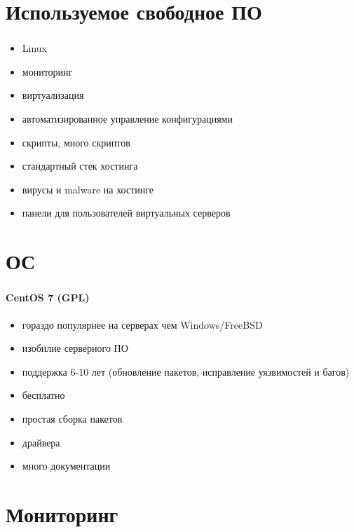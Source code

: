
\section{Используемое свободное ПО}

\begin{frame}
\frametitle{\insertsection}
\begin{itemize}
	\item Linux
	\item мониторинг
	\item виртуализация
	\item автоматизированное управление конфигурациями
	\item скрипты, много скриптов
	\item стандартный стек хостинга
	\item вирусы и malware на хостинге
	\item панели для пользователей виртуальных серверов
\end{itemize}
\end{frame}


\section{ОС}

\begin{frame}
\frametitle{\insertsection}
\framesubtitle{CentOS 7 (GPL)}
\begin{itemize}
	\item гораздо популярнее на серверах чем Windows/FreeBSD
	\item изобилие серверного ПО
	\item поддержка 6-10 лет (обновление пакетов, исправление уязвимостей и багов)
	\item бесплатно
	\item простая сборка пакетов
	\item драйвера
	\item много документации
\end{itemize}
\end{frame}


\section{Мониторинг}

